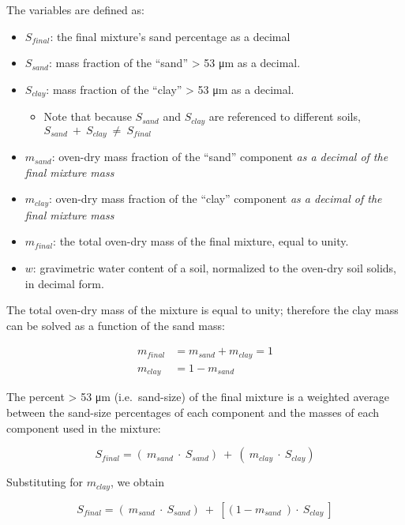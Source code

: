 \documentclass[
  letterpaper,
  openany]{book}
\providecommand{\tightlist}{%
  \setlength{\itemsep}{0pt}\setlength{\parskip}{0pt}}
\begin{document}
The variables are defined as:

\begin{itemize}
\item
  \(S_{final}\): the final mixture's sand percentage as a decimal
\item
  \(S_{sand}\): mass fraction of the ``sand'' \textgreater{} 53 μm as a decimal.
\item
  \(S_{clay}\): mass fraction of the ``clay'' \textgreater{} 53 μm as a decimal.

  \begin{itemize}
  \tightlist
  \item
    Note that because \(S_{ sand}\) and \(S_{clay}\) are referenced to different soils, \(S_{sand}~+~S_{clay}~\neq~S_{final}\)
  \end{itemize}
\item
  \(m_{sand}\): oven-dry mass fraction of the ``sand'' component \emph{as a decimal of the final mixture mass}
\item
  \(m_{clay}\): oven-dry mass fraction of the ``clay'' component \emph{as a decimal of the final mixture mass}
\item
  \(m_{final}\): the total oven-dry mass of the final mixture, equal to unity.
\item
  \(w\): gravimetric water content of a soil, normalized to the oven-dry soil solids, in decimal form.
\end{itemize}

The total oven-dry mass of the mixture is equal to unity; therefore the clay mass can be solved as a function of the sand mass:

\begin{align}
m_{final} &= m_{sand} + m_{clay} = 1 \\
m_{clay} &= 1 - m_{ sand}
\end{align}

The percent \textgreater{} 53 μm (i.e.~sand-size) of the final mixture is a weighted average between the sand-size percentages of each component and the masses of each component used in the mixture:

\begin{equation}
S_{final} = (~m_{sand}~\cdot~S_{sand})~+~(~m_{clay}~\cdot~S_{clay})
\end{equation}

Substituting for \(m_{clay}\), we obtain

\begin{equation}
S_{final} = (~m_{sand}~\cdot~S_{sand})~+~\left[(1-m_{sand}~)\cdot~S_{clay}~\right]
\end{equation}
\end{document}
